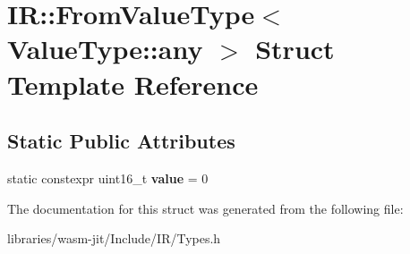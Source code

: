 \hypertarget{struct_i_r_1_1_from_value_type_3_01_value_type_1_1any_01_4}{}\section{IR\+:\+:From\+Value\+Type$<$ Value\+Type\+:\+:any $>$ Struct Template Reference}
\label{struct_i_r_1_1_from_value_type_3_01_value_type_1_1any_01_4}
\subsection*{Static Public Attributes}
\begin{DoxyCompactItemize}
\item 
\mbox{\label{struct_i_r_1_1_from_value_type_3_01_value_type_1_1any_01_4_af547fba1379bd2ea21a0616d2b8d7262}} 
static constexpr uint16\+\_\+t {\bfseries value} = 0
\end{DoxyCompactItemize}


The documentation for this struct was generated from the following file\+:\begin{DoxyCompactItemize}
\item 
libraries/wasm-\/jit/\+Include/\+I\+R/Types.\+h\end{DoxyCompactItemize}
